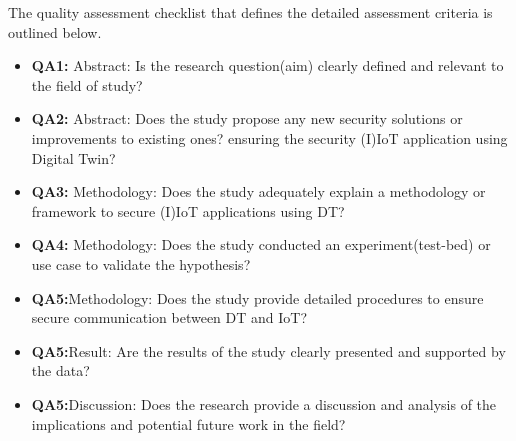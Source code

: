 The quality assessment checklist that defines the detailed assessment criteria  is outlined below.
\begin{itemize}
    \item \textbf{QA1:} Abstract: Is the research question(aim) clearly defined and relevant to the field of study?
    \item \textbf{QA2:} Abstract: Does the study propose any new security solutions or improvements to existing ones? ensuring the security (I)IoT application using Digital Twin?
    \item \textbf{QA3:} Methodology: Does the study adequately explain a methodology or framework to secure (I)IoT applications using DT?
    \item \textbf{QA4:} Methodology: Does the study conducted an experiment(test-bed) or use case to validate the hypothesis?
    \item \textbf{QA5:}Methodology: Does the study provide detailed procedures to ensure secure communication between DT and IoT?
    \item \textbf{QA5:}Result: Are the results of the study clearly presented and supported by the data?
    \item \textbf{QA5:}Discussion: Does the research provide a discussion and analysis of the implications and potential future work in the field?
\end{itemize}

